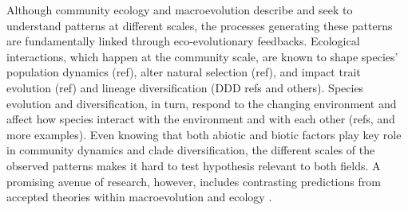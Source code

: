 
Although community ecology and macroevolution describe and seek to understand patterns at different scales, the processes generating these patterns are fundamentally linked through eco-evolutionary feedbacks. %
Ecological interactions, which happen at the community scale, are known to shape species’ population dynamics (ref), alter natural selection (ref), and impact trait evolution (ref) and lineage diversification (DDD refs and others). %
Species evolution and diversification, in turn, respond to the changing environment and affect how species interact with the environment and with each other (refs, and more examples). %
Even knowing that both abiotic and biotic factors play key role in community dynamics and clade diversification, the different scales of the observed patterns makes it hard to test hypothesis relevant to both fields.
A promising avenue of research, however, includes contrasting predictions from accepted theories within macroevolution and ecology \citep{voje2015role}.



